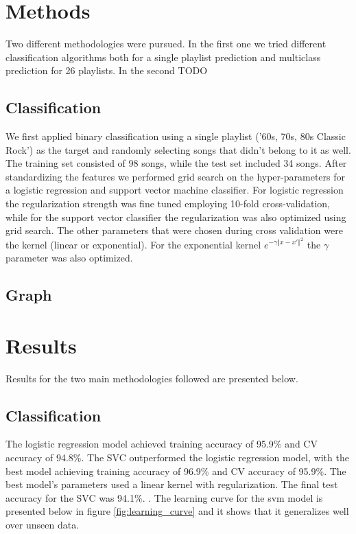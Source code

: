 \documentclass[acmtog]{acmart}
\begin{document}
\section{Methods}
\label{sec:sim}

Two different methodologies were pursued. In the first one we tried different classification algorithms both for a single playlist prediction and multiclass prediction for 26 playlists. In the second TODO

\subsection{Classification}

We first applied binary classification using a single playlist ('60s, 70s, 80s Classic Rock') as the target and randomly selecting songs that didn't belong to it as well. The training set consisted of 98 songs, while the test set included 34 songs. After standardizing the features we performed grid search on the hyper-parameters for a logistic regression and support vector machine classifier. For logistic regression the regularization strength was fine tuned employing 10-fold cross-validation, while for the support vector classifier the regularization was also optimized using grid search. The other parameters that were chosen during cross validation were the kernel (linear or exponential). For the exponential kernel $e^{-\gamma {\Vert x -x' \Vert}^{2}}$ the $\gamma$ parameter was also optimized.

\subsection{Graph}

\section{Results}

Results for the two main methodologies followed are presented below.

\subsection{Classification}
The logistic regression model achieved training accuracy of 95.9\% and CV accuracy of 94.8\%. The SVC outperformed the logistic regression model, with the best model achieving training accuracy of 96.9\% and CV accuracy of 95.9\%. The best model's parameters used a linear kernel with regularization. The final test accuracy for the SVC was 94.1\%. .
The learning curve for the svm model is presented below in figure \ref{fig:learning_curve} and it shows that it generalizes well over unseen data.
\newline
\end{document}
